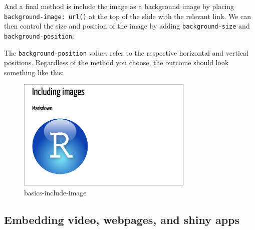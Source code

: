 \documentclass[
]{book}
\newenvironment{Shaded}{\begin{snugshade}}{\end{snugshade}}
\newcommand{\DecValTok}[1]{\textcolor[rgb]{0.06,0.06,0.06}{#1}}
\newcommand{\ErrorTok}[1]{\textcolor[rgb]{0.14,0.14,0.14}{\textbf{#1}}}
\newcommand{\KeywordTok}[1]{\textcolor[rgb]{0.27,0.27,0.27}{\textbf{#1}}}
\newcommand{\NormalTok}[1]{#1}
\newcommand{\OperatorTok}[1]{\textcolor[rgb]{0.43,0.43,0.43}{\textbf{#1}}}
\newcommand{\StringTok}[1]{\textcolor[rgb]{0.5,0.5,0.5}{#1}}
\begin{document}
And a final method is include the image as a background image by placing \texttt{background-image:\ url()} at the top of the slide with the relevant link. We can then control the size and position of the image by adding \texttt{background-size} and \texttt{background-position}:

\begin{Shaded}
\end{Shaded}

The \texttt{background-position} values refer to the respective horizontal and vertical positions. Regardless of the method you choose, the outcome should look something like this:

\begin{figure}
\centering
\includegraphics[width=0.75\textwidth,height=\textheight]{img/02_basics-include-image.png}
\caption{basics-include-image}
\end{figure}

\hypertarget{embedding-video-webpages-and-shiny-apps}{%
\subsection{Embedding video, webpages, and shiny apps}\label{embedding-video-webpages-and-shiny-apps}}
\end{document}
